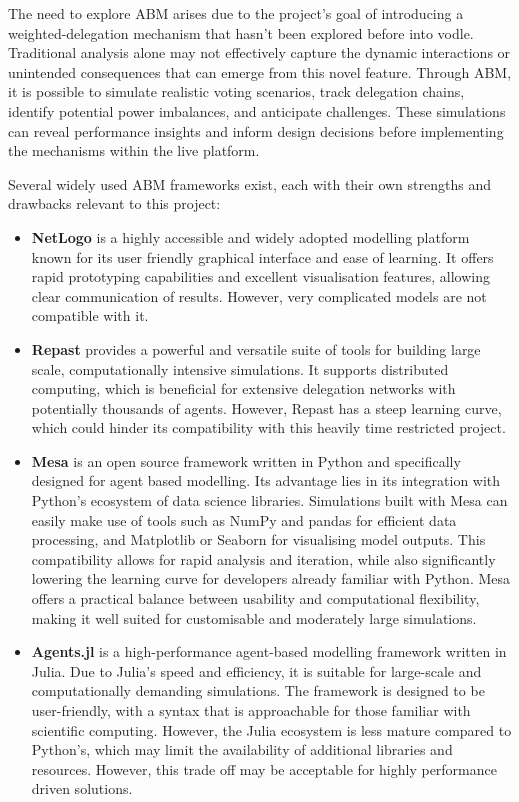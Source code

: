 The need to explore ABM arises due to the project's goal of introducing a weighted-delegation mechanism that hasn't been explored before into vodle. Traditional analysis alone may not effectively capture the dynamic interactions or unintended consequences that can emerge from this novel feature. Through ABM, it is possible to simulate realistic voting scenarios, track delegation chains, identify potential power imbalances, and anticipate challenges. These simulations can reveal performance insights and inform design decisions before implementing the mechanisms within the live platform.

Several widely used ABM frameworks exist, each with their own strengths and drawbacks relevant to this project:
\begin{itemize}
  \item \textbf{NetLogo} \citep{netlogo} is a highly accessible and widely adopted modelling platform known for its user friendly graphical interface and ease of learning. It offers rapid prototyping capabilities and excellent visualisation features, allowing clear communication of results. However, very complicated models are not compatible with it.
  \item \textbf{Repast} \citep{repast} provides a powerful and versatile suite of tools for building large scale, computationally intensive simulations. It supports distributed computing, which is beneficial for extensive delegation networks with potentially thousands of agents. However, Repast has a steep learning curve, which could hinder its compatibility with this heavily time restricted project.
  \item \textbf{Mesa} \citep{kazil_utilizing_2020} is an open source framework written in Python and specifically designed for agent based modelling. Its advantage lies in its integration with Python's ecosystem of data science libraries. Simulations built with Mesa can easily make use of tools such as NumPy and pandas for efficient data processing, and Matplotlib or Seaborn for visualising model outputs. This compatibility allows for rapid analysis and iteration, while also significantly lowering the learning curve for developers already familiar with Python. Mesa offers a practical balance between usability and computational flexibility, making it well suited for customisable and moderately large simulations.
  \item \textbf{Agents.jl} \citep{agentsjl} is a high-performance agent-based modelling framework written in Julia. Due to Julia's speed and efficiency, it is suitable for large-scale and computationally demanding simulations. The framework is designed to be user-friendly, with a syntax that is approachable for those familiar with scientific computing. However, the Julia ecosystem is less mature compared to Python's, which may limit the availability of additional libraries and resources. However, this trade off may be acceptable for highly performance driven solutions.
\end{itemize}
